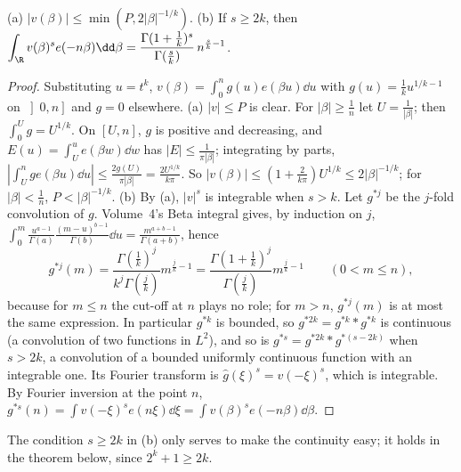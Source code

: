 \begin{lemma}\label{lem:singint}
(a) $|v(\beta)|\le\min(P,2|\beta|^{-1/k})$.
(b) If $s\ge2k$, then $\displaystyle\int_\R v(\beta)^se(-n\beta)\dd\beta=\frac{\Gamma(1+\frac1k)^s}{\Gamma(\frac sk)}\,n^{\frac sk-1}$.
\end{lemma}
\begin{proof}
Substituting $u=t^k$, $v(\beta)=\int_0^ng(u)e(\beta u)\dd u$ with $g(u)=\frac1ku^{1/k-1}$ on $\left]0,n\right]$ and $g=0$ elsewhere.
(a) $|v|\le P$ is clear. For $|\beta|\ge\frac1n$ let $U=\frac1{|\beta|}$; then $\int_0^Ug=U^{1/k}$. On $[U,n]$, $g$ is positive and decreasing, and $E(u)=\int_U^ue(\beta w)\dd w$ has $|E|\le\frac1{\pi|\beta|}$; integrating by parts, $|\int_U^nge(\beta u)\dd u|\le\frac{2g(U)}{\pi|\beta|}=\frac{2U^{1/k}}{k\pi}$. So $|v(\beta)|\le(1+\frac2{k\pi})U^{1/k}\le2|\beta|^{-1/k}$; for $|\beta|<\frac1n$, $P<|\beta|^{-1/k}$.
(b) By (a), $|v|^s$ is integrable when $s>k$. Let $g^{*j}$ be the $j$-fold convolution of $g$. Volume~4's Beta integral gives, by induction on $j$, $\int_0^m\frac{u^{a-1}}{\Gamma(a)}\frac{(m-u)^{b-1}}{\Gamma(b)}\dd u=\frac{m^{a+b-1}}{\Gamma(a+b)}$, hence
\[
g^{*j}(m)=\frac{\Gamma(\frac1k)^j}{k^j\Gamma(\frac jk)}m^{\frac jk-1}=\frac{\Gamma(1+\frac1k)^j}{\Gamma(\frac jk)}m^{\frac jk-1}\qquad(0<m\le n),
\]
because for $m\le n$ the cut-off at $n$ plays no role; for $m>n$, $g^{*j}(m)$ is at most the same expression. In particular $g^{*k}$ is bounded, so $g^{*2k}=g^{*k}*g^{*k}$ is continuous (a convolution of two functions in $L^2$), and so is $g^{*s}=g^{*2k}*g^{*(s-2k)}$ when $s>2k$, a convolution of a bounded uniformly continuous function with an integrable one. Its Fourier transform is $\hat g(\xi)^s=v(-\xi)^s$, which is integrable. By Fourier inversion at the point $n$, $g^{*s}(n)=\int v(-\xi)^se(n\xi)\dd\xi=\int v(\beta)^se(-n\beta)\dd\beta$.
\end{proof}

The condition $s\ge2k$ in (b) only serves to make the continuity easy; it holds in the theorem below, since $2^k+1\ge2k$.

